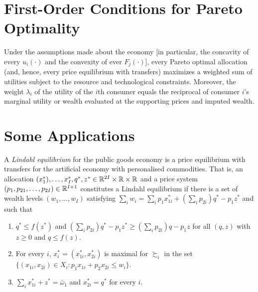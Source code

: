 \section{First-Order Conditions for Pareto Optimality}
\label{piv.chxvi.pareto-focs}

\begin{prop}
    Under the assumptions made about the economy [in particular, the concavity of every $u_i(\cdot)$ and the convexity of ever $F_j(\cdot)$], every Pareto optimal allocation (and, hence, every price equilibrium with transfers) maximizes a weighted sum of utilities subject to the resource and technological constraints. Moreover, the weight $\lambda_i$ of the utility of the $i$th consumer equals the reciprocal of consumer $i$'s marginal utility or wealth evaluated at the supporting prices and imputed wealth.
\end{prop}


\section{Some Applications}

\begin{defn}
    A \emph{Lindahl equilibrium} for the public goods economy is a price equilibrium with transfers for the artificial economy with personalised commodities. That is, an allocation $(x^*_1), \dots, x^*_I, q^*, z^* \in \mathbb{R}^{2I} \times \mathbb{R} \times \mathbb{R}$ and a price system $(p_1, p_{21}, \dots, p_{2I}) \in \mathbb{R}^{I + 1}$ constitutes a Lindahl equilibrium if there is a set of wealth levels $(w_1, \dots, w_I)$ satisfying $\sum_i w_i = \sum_i p_1 x^*_{1i} + (\sum_i p_{2i}) q^* - p_1 z^*$ and such that
    \begin{enumerate}
        \item $q^* \leq f(z^*)$ and $(\sum_i p_{2i}) q^* - p_1 z^* \geq (\sum_i p_{2i}) q - p_1 z$ for all $(q, z)$ with $z \geq 0$ and $q \leq f(z)$.
        \item For every $i$, $x^*_i = (x^*_{1i}, x^*_{2i})$ is maximal for $\succsim_i$ in the set $\{(x_{1i}, x_{2i}) \in X_i: p_1 x_{1i} + p_2 x_{2i} \leq w_i\}$.
        \item $\sum_i x^*_{1i} + z^* = \bar{\omega}_1$ and $x^*_{2i} = q^*$ for every $i$.
    \end{enumerate}
\end{defn}

